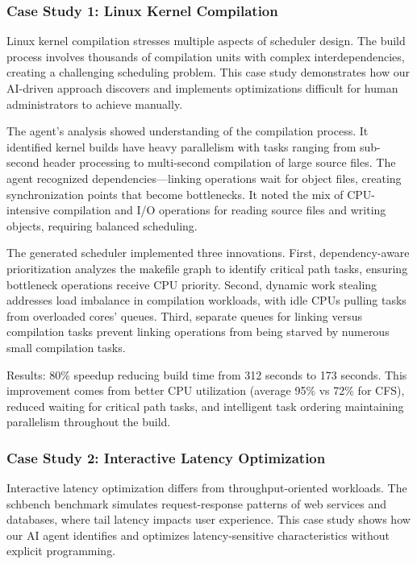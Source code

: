 \subsubsection{Case Study 1: Linux Kernel Compilation}

Linux kernel compilation stresses multiple aspects of scheduler design. The build process involves thousands of compilation units with complex interdependencies, creating a challenging scheduling problem. This case study demonstrates how our AI-driven approach discovers and implements optimizations difficult for human administrators to achieve manually.

The agent's analysis showed understanding of the compilation process. It identified kernel builds have heavy parallelism with tasks ranging from sub-second header processing to multi-second compilation of large source files. The agent recognized dependencies—linking operations wait for object files, creating synchronization points that become bottlenecks. It noted the mix of CPU-intensive compilation and I/O operations for reading source files and writing objects, requiring balanced scheduling.

The generated scheduler implemented three innovations. First, dependency-aware prioritization analyzes the makefile graph to identify critical path tasks, ensuring bottleneck operations receive CPU priority. Second, dynamic work stealing addresses load imbalance in compilation workloads, with idle CPUs pulling tasks from overloaded cores' queues. Third, separate queues for linking versus compilation tasks prevent linking operations from being starved by numerous small compilation tasks.

Results: 80\% speedup reducing build time from 312 seconds to 173 seconds. This improvement comes from better CPU utilization (average 95\% vs 72\% for CFS), reduced waiting for critical path tasks, and intelligent task ordering maintaining parallelism throughout the build.

\subsubsection{Case Study 2: Interactive Latency Optimization}

Interactive latency optimization differs from throughput-oriented workloads. The schbench benchmark simulates request-response patterns of web services and databases, where tail latency impacts user experience. This case study shows how our AI agent identifies and optimizes latency-sensitive characteristics without explicit programming.


